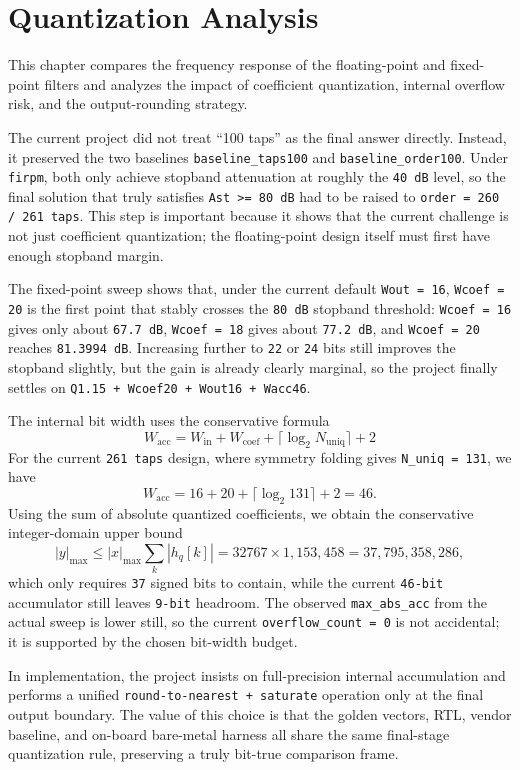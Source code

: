 \section{Quantization Analysis}

This chapter compares the frequency response of the floating-point and fixed-point filters and analyzes the impact of coefficient quantization, internal overflow risk, and the output-rounding strategy.

The current project did not treat ``100 taps'' as the final answer directly. Instead, it preserved the two baselines \texttt{baseline\_taps100} and \texttt{baseline\_order100}. Under \texttt{firpm}, both only achieve stopband attenuation at roughly the \texttt{40 dB} level, so the final solution that truly satisfies \texttt{Ast >= 80 dB} had to be raised to \texttt{order = 260 / 261 taps}. This step is important because it shows that the current challenge is not just coefficient quantization; the floating-point design itself must first have enough stopband margin.

The fixed-point sweep shows that, under the current default \texttt{Wout = 16}, \texttt{Wcoef = 20} is the first point that stably crosses the \texttt{80 dB} stopband threshold: \texttt{Wcoef = 16} gives only about \texttt{67.7 dB}, \texttt{Wcoef = 18} gives about \texttt{77.2 dB}, and \texttt{Wcoef = 20} reaches \texttt{81.3994 dB}. Increasing further to \texttt{22} or \texttt{24} bits still improves the stopband slightly, but the gain is already clearly marginal, so the project finally settles on \texttt{Q1.15 + Wcoef20 + Wout16 + Wacc46}.

The internal bit width uses the conservative formula
\[
W_{\mathrm{acc}} = W_{\mathrm{in}} + W_{\mathrm{coef}} + \lceil \log_2 N_{\mathrm{uniq}} \rceil + 2
\]
For the current \texttt{261 taps} design, where symmetry folding gives \texttt{N\_uniq = 131}, we have
\[
W_{\mathrm{acc}} = 16 + 20 + \lceil \log_2 131 \rceil + 2 = 46 .
\]
Using the sum of absolute quantized coefficients, we obtain the conservative integer-domain upper bound
\[
|y|_{\max} \le |x|_{\max} \sum_k |h_q[k]| = 32767 \times 1{,}153{,}458 = 37{,}795{,}358{,}286 ,
\]
which only requires \texttt{37} signed bits to contain, while the current \texttt{46-bit} accumulator still leaves \texttt{9-bit} headroom. The observed \texttt{max\_abs\_acc} from the actual sweep is lower still, so the current \texttt{overflow\_count = 0} is not accidental; it is supported by the chosen bit-width budget.

In implementation, the project insists on full-precision internal accumulation and performs a unified \texttt{round-to-nearest + saturate} operation only at the final output boundary. The value of this choice is that the golden vectors, RTL, vendor baseline, and on-board bare-metal harness all share the same final-stage quantization rule, preserving a truly bit-true comparison frame.
